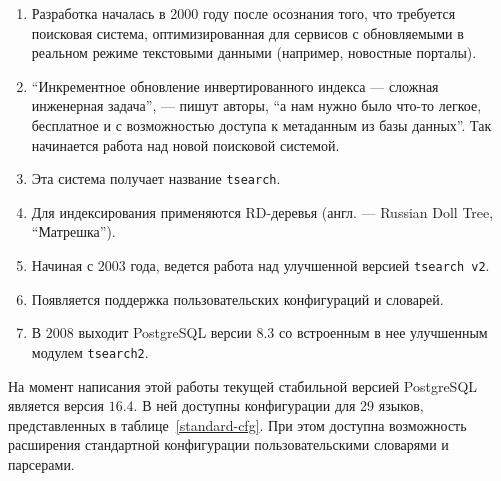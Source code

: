 \begin{enumerate}
    \item Разработка началась в 2000 году после осознания того, что требуется поисковая система, оптимизированная для сервисов с обновляемыми в реальном режиме текстовыми данными (например, новостные порталы).
    \item \enquote{Инкрементное обновление инвертированного индекса --- сложная инженерная задача}, --- пишут авторы, \enquote{а нам нужно было что-то легкое, бесплатное и с возможностью доступа к метаданным из базы данных}.
          Так начинается работа над новой поисковой системой.
    \item Эта система получает название \texttt{tsearch}.
    \item Для индексирования применяются RD-деревья (англ. --- Russian Doll Tree, \enquote{Матрешка}).
    \item Начиная с $2003$ года, ведется работа над улучшенной версией \texttt{tsearch v2}.
    \item Появляется поддержка пользовательских конфигураций и словарей.
    \item В $2008$ выходит PostgreSQL версии $8.3$ со встроенным в нее улучшенным модулем \texttt{tsearch2}.
\end{enumerate}

На момент написания этой работы текущей стабильной версией PostgreSQL является версия $16.4$.
В ней доступны конфигурации для 29 языков, представленных в таблице~\ref{standard-cfg}.
При этом доступна возможность расширения стандартной конфигурации пользовательскими словарями и парсерами.

